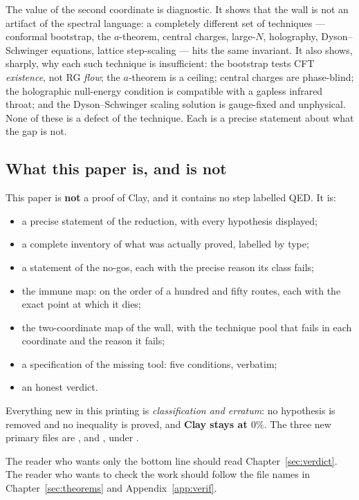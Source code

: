 The value of the second coordinate is diagnostic. It shows that the wall is not an artifact of
the spectral language: a completely different set of techniques --- conformal bootstrap, the
$a$-theorem, central charges, large-$N$, holography, Dyson--Schwinger equations, lattice
step-scaling --- hits the same invariant. It also shows, sharply, why each such technique is
insufficient: the bootstrap tests CFT \emph{existence}, not RG \emph{flow}; the $a$-theorem is a
ceiling; central charges are phase-blind; the holographic null-energy condition is compatible
with a gapless infrared throat; and the Dyson--Schwinger scaling solution is gauge-fixed and
unphysical. None of these is a defect of the technique. Each is a precise statement about what
the gap is not.

\figtwocoord

\subsection{What this paper is, and is not}

This paper is \textbf{not} a proof of Clay, and it contains no step labelled QED. It is:

\begin{itemize}
\item a precise statement of the reduction, with every hypothesis displayed;
\item a complete inventory of what was actually proved, labelled by type;
\item a statement of the no-gos, each with the precise reason its class fails;
\item the immune map: on the order of a hundred and fifty routes, each with the exact point at
  which it dies;
\item the two-coordinate map of the wall, with the technique pool that fails in each coordinate
  and the reason it fails;
\item a specification of the missing tool: five conditions, verbatim;
\item an honest verdict.
\end{itemize}

Everything new in this printing is \emph{classification and erratum}: no hypothesis is removed and
no inequality is proved, and \textbf{Clay stays at $0\%$}. The three new primary files are
,  and , under
.

The reader who wants only the bottom line should read Chapter~\ref{sec:verdict}. The reader who
wants to check the work should follow the file names in Chapter~\ref{sec:theorems} and
Appendix~\ref{app:verif}.

